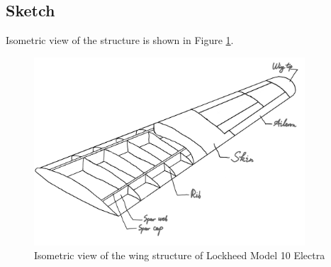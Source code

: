 \subsection{Sketch}

Isometric view of the structure is shown in Figure \ref{fig:wing_structural_arrangement}.

\begin{figure}[!htp]
        \centering
        \includegraphics[width=0.9\textwidth]{images/wing structure.jpg}
        \caption{Isometric view of the wing structure of Lockheed Model 10 Electra}
        \label{fig:wing_structural_arrangement}
\end{figure}